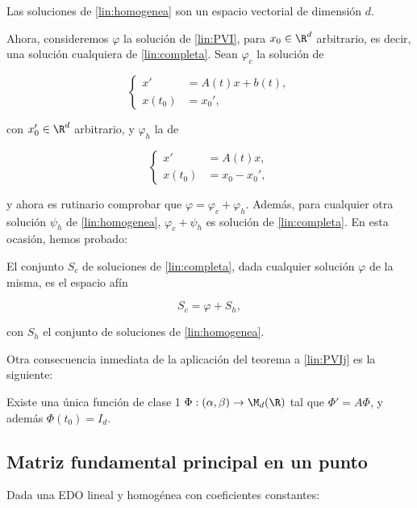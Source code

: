 \begin{ncor}
  Las soluciones de \ref{lin:homogenea} son un espacio vectorial de dimensión $d$.
\end{ncor}

Ahora, consideremos $\varphi$ la solución de \ref{lin:PVI}, para $x_0\in\R^d$ arbitrario, es decir, una solución cualquiera de \ref{lin:completa}.
Sean $\varphi_c$ la solución de

\begin{equation}
\left\{\begin{array}{rl}
x' &=A(t)x+b(t), \\
x(t_0)&=x_0',
\end{array}\right.
\end{equation}

con $x_0'\in\R^d$ arbitrario, y $\varphi_h$ la de

\begin{equation}
\left\{\begin{array}{rl}
x' &=A(t)x, \\
x(t_0)&=x_0 - x_0',
\end{array}\right.
\end{equation}

y ahora es rutinario comprobar que $\varphi = \varphi_c + \varphi_h$. Además, para cualquier otra solución $\psi_{h}$ de \ref{lin:homogenea}, $\varphi_c + \psi_h$
es solución de \ref{lin:completa}.
En esta ocasión, hemos probado:

\begin{ncor}
  El conjunto $S_c$ de soluciones de \ref{lin:completa}, dada cualquier solución $\varphi$ de la misma, es el espacio afín

  \[
    S_c = \varphi + S_h,
    \]

    con $S_h$ el conjunto de soluciones de \ref{lin:homogenea}.
\end{ncor}

Otra consecuencia inmediata de la aplicación del teorema a \ref{lin:PVIj} es la siguiente:

\begin{ncor} \label{lin:cormfp}
  Existe una única función de clase 1 $\Phi: (\alpha, \beta) \to \M_d(\R)$ tal que $\Phi' = A\Phi$, y
  además $\Phi(t_0) = I_d$.
\end{ncor}

\subsection{Matriz fundamental principal en un punto}
Dada una EDO lineal y homogénea con coeficientes constantes:

